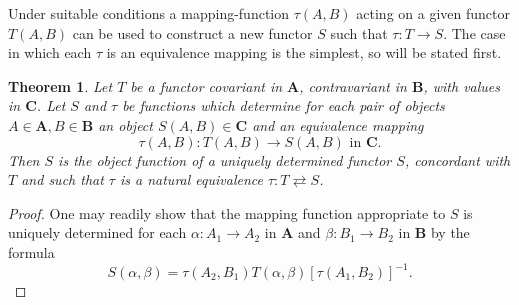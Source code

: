 \documentclass[11pt,a4paper]{report}
\newtheorem{theorem}{Theorem}
\begin{document}
Under suitable conditions a mapping\hyp{}function $\tau(A,B)$ acting on a given functor $T(A,B)$ can be used to 
construct a new functor $S$ such that $\tau:T\rightarrow S$. The case in which each $\tau$ is an equivalence
mapping is the simplest, so will be stated first.
\begin{theorem}\label{thm:func_trans1}
	Let $T$ be a functor covariant in $\mathbf{A}$, contravariant in $\mathbf{B}$, with values in
	$\mathbf{C}$. Let $S$ and $\tau$ be functions which determine for each pair of objects $A\in\mathbf{A},
	B\in\mathbf{B}$ an object $S(A,B)\in\mathbf{C}$ and an equivalence mapping
	\begin{equation*}
		\tau(A,B):T(A,B)\rightarrow S(A,B)\text{ in }\mathbf{C}.
	\end{equation*}
	Then $S$ is the object function of a uniquely determined functor $S$, concordant with $T$ and such that
	$\tau$ is a natural equivalence $\tau:T\rightleftarrows S$.
\end{theorem}
\begin{proof}
	One may readily show that the mapping function appropriate to $S$ is uniquely determined for each
	$\alpha:A_1\rightarrow A_2$ in $\mathbf{A}$ and $\beta:B_1\rightarrow B_2$ in $\mathbf{B}$ by the
	formula
	\begin{equation*}
		S(\alpha,\beta)=\tau(A_2,B_1)T(\alpha,\beta){[\tau(A_1,B_2)]}^{-1}.
	\end{equation*}
\end{proof}
\end{document}
